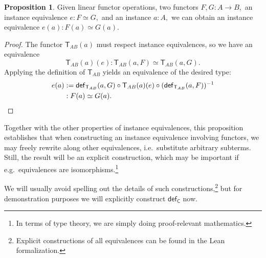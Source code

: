 \documentclass[a4paper]{article}
\theoremstyle{definition}
\newtheorem{proposition}[definition]{Proposition}
\theoremstyle{remark}
\renewcommand{\equiv}{\simeq}
\newcommand{\nm}{\mathsf}
\newcommand{\fndef}[1]{\nm{def}_{#1}}
\newcommand{\combinator}{\nm}
\newcommand{\appFun}{\combinator{T}}
\newcommand{\swapFun}{\combinator{C}}
\begin{document}
\begin{proposition}
  \label{prp:congrfun}
  Given linear functor operations, two functors $F,G : A \to B,$ an instance equivalence
  $e : F \equiv G,$ and an instance $a : A,$ we can obtain an instance equivalence
  $e(a) : F(a) \equiv G(a).$
\end{proposition}
\vspace{-1ex}
\begin{proof}
  The functor $\appFun_{AB}(a)$ must respect instance equivalences, so we have an equivalence
  \[\appFun_{AB}(a)(e) : \appFun_{AB}(a,F) \equiv \appFun_{AB}(a,G).\]
  Applying the definition of $\appFun_{AB}$ yields an equivalence of the desired type:
  \begin{align*}
    e(a) &:= \fndef{\appFun_{AB}}(a,G) \circ \appFun_{AB}(a)(e) \circ (\fndef{\appFun_{AB}}(a,F))^{-1}\\
         &: F(a) \equiv G(a).
    \qedhere
  \end{align*}
\end{proof}

Together with the other properties of instance equivalences, this proposition establishes
that when constructing an instance equivalence involving functors, we may freely rewrite
along other equivalences, i.e.\ substitute arbitrary subterms. Still, the result will be an
explicit construction, which may be important if e.g.\ equivalences are
isomorphisms.\footnote{In terms of type theory, we are simply doing proof-relevant mathematics.}

We will usually avoid spelling out the details of such constructions,\footnote{Explicit
constructions of all equivalences can be found in the Lean formalization.} but for
demonstration purposes we will explicitly construct $\fndef{\swapFun}$ now.
\end{document}
